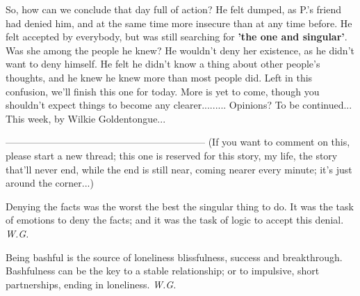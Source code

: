 So, how can we conclude that day full of action?
He felt dumped, as P.'s friend had denied him, and at the same time more insecure than at any time before. 
He felt accepted by everybody, but was still searching for \textbf{'the one and singular'}. Was she among the people he knew? He wouldn't deny her existence, as he didn't want to deny himself. 
He felt he didn't know a thing about other people's thoughts, and he knew he knew more than most people did. 
Left in this confusion, we'll finish this one for today. 
More is yet to come, though you shouldn't expect things to become any clearer.........
Opinions?
To be continued...
This week, by Wilkie Goldentongue...

--------------------------------------------------------------
(If you want to comment on this, please start a new thread; this one is reserved for this story, my life, the story that'll never end, while the end is still near, coming nearer every minute; it's just around the corner...)

Denying 
the facts 
was the worst 
the best 
the singular thing to do. 
It was the task of emotions 
to deny the facts; 
and it was the task of logic 
to accept this denial. 
\emph{W.G.}

Being bashful 
is the source of loneliness 
blissfulness, 
success and breakthrough. 
Bashfulness can be the key 
to a stable relationship; 
or to impulsive, short partnerships, 
ending in loneliness. 
\emph{W.G.}
